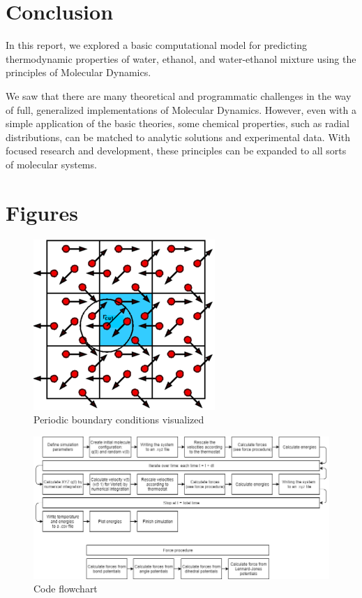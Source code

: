 \documentclass[11pt,a4paper]{article}
\begin{document}
\section{Conclusion}
In this report, we explored a basic computational model for predicting thermodynamic properties of water, ethanol, and water-ethanol mixture using the principles of Molecular Dynamics. 

We saw that there are many theoretical and programmatic challenges in the way of full, generalized implementations of Molecular Dynamics. However, even with a simple application of the basic theories, some chemical properties, such as radial distributions, can be matched to analytic solutions and experimental data. With focused research and development, these principles can be expanded to all sorts of molecular systems.


\clearpage



\clearpage
\appendix
\section{Figures}

\begin{figure}[ht]
\centering
\includegraphics[scale=0.6]{figures/PeriodicBoundaryConditions}
\caption{Periodic boundary conditions visualized}\label{fig:pbc}
\end{figure}

\begin{figure}
\centering
\includegraphics[scale=0.45]{FlowChartMD.png}
\caption{Code flowchart}\label{fig:flowchart}
\end{figure} 
\end{document}
